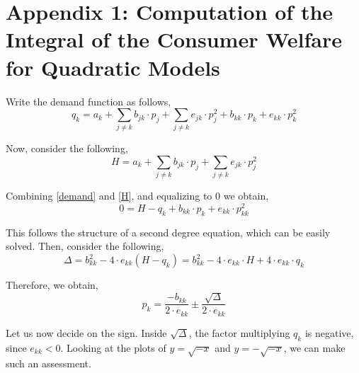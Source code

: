 \documentclass[12pt]{article}
\begin{document}
\newpage
\listoffigures

\newpage
\listoftables

\newpage
\section*{Appendix 1: Computation of the Integral of the Consumer Welfare for Quadratic Models}

Write the demand function as follows,
\begin{equation} \label{demand}
q_k = a_k + \sum_{j \neq k} b_{jk} \cdot p_j + \sum_{j \neq k} e_{jk} \cdot p_j^2 + b_{kk} \cdot p_k + e_{kk} \cdot p_k^2
\end{equation}

Now, consider the following,
\begin{equation} \label{H}
H = a_k + \sum_{j \neq k} b_{jk} \cdot p_j + \sum_{j \neq k} e_{jk} \cdot p_j^2
\end{equation}

Combining \ref{demand} and \ref{H}, and equalizing to $0$ we obtain,
\begin{equation*}
0 = H  - q_k + b_{kk} \cdot p_k + e_{kk} \cdot p_{kk}^2
\end{equation*}

This follows the structure of a second degree equation, which can be easily solved. Then, consider the following,
\begin{equation*}
\Delta = b_{kk}^2 - 4 \cdot e_{kk} (H - q_k) = b_{kk}^2 - 4 \cdot e_{kk} \cdot H + 4 \cdot e_{kk} \cdot q_k 
\end{equation*}

Therefore, we obtain,
\begin{equation*}
p_k = \frac{-b_{kk}}{2 \cdot e_{kk}} \pm \frac{\sqrt{\Delta}}{2 \cdot e_{kk}}
\end{equation*}

Let us now decide on the sign. Inside $\sqrt{\Delta}$, the factor multiplying $q_k$ is negative, since $e_{kk} < 0$. Looking at the plots of $y = \sqrt{-x}$ and $y = -\sqrt{-x}$, we can make such an assessment.\\
\end{document}

